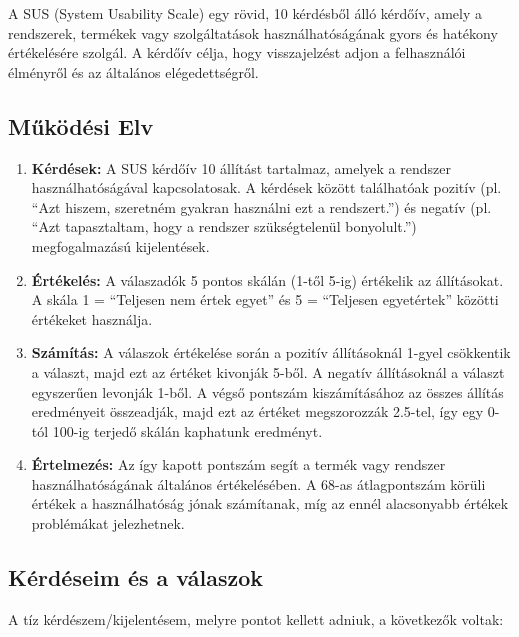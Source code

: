 A SUS (System Usability Scale) egy rövid, 10 kérdésből álló kérdőív, amely a rendszerek, termékek vagy szolgáltatások használhatóságának gyors és hatékony értékelésére szolgál. A kérdőív célja, hogy visszajelzést adjon a felhasználói élményről és az általános elégedettségről.

\subsection{Működési Elv}
\begin{enumerate}
    \item \textbf{Kérdések:} A SUS kérdőív 10 állítást tartalmaz, amelyek a rendszer használhatóságával kapcsolatosak. A kérdések között találhatóak pozitív (pl. ``Azt hiszem, szeretném gyakran használni ezt a rendszert.'') és negatív (pl. ``Azt tapasztaltam, hogy a rendszer szükségtelenül bonyolult.'') megfogalmazású kijelentések.
    
    \item \textbf{Értékelés:} A válaszadók 5 pontos skálán (1-től 5-ig) értékelik az állításokat. A skála 1 = ``Teljesen nem értek egyet'' és 5 = ``Teljesen egyetértek'' közötti értékeket használja.
    
    \item \textbf{Számítás:} A válaszok értékelése során a pozitív állításoknál 1-gyel csökkentik a választ, majd ezt az értéket kivonják 5-ből. A negatív állításoknál a választ egyszerűen levonják 1-ből. A végső pontszám kiszámításához az összes állítás eredményeit összeadják, majd ezt az értéket megszorozzák 2.5-tel, így egy 0-tól 100-ig terjedő skálán kaphatunk eredményt.
    
    \item \textbf{Értelmezés:} Az így kapott pontszám segít a termék vagy rendszer használhatóságának általános értékelésében. A 68-as átlagpontszám körüli értékek a használhatóság jónak számítanak, míg az ennél alacsonyabb értékek problémákat jelezhetnek.
\end{enumerate}

\subsection{Kérdéseim és a válaszok}
A tíz kérdészem/kijelentésem, melyre pontot kellett adniuk, a következők voltak:

